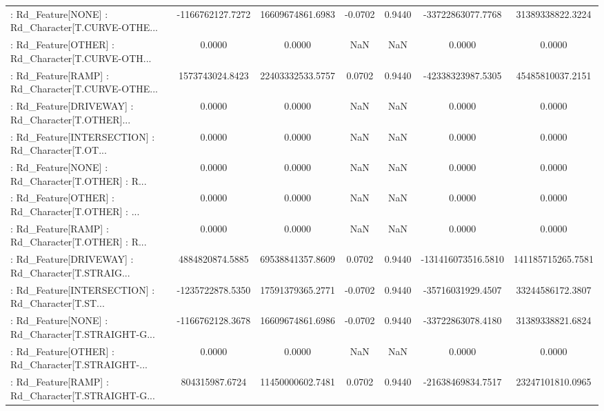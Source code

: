 \begin{longtable}{p{4cm}cccccc}
 : Rd\_Feature[NONE] : Rd\_Character[T.CURVE-OTHE... &  -1166762127.7272 &  16609674861.6983 & -0.0702 &       0.9440 &  -33722863077.7768 &  31389338822.3224 \\
 : Rd\_Feature[OTHER] : Rd\_Character[T.CURVE-OTH... &            0.0000 &            0.0000 &     NaN &          NaN &             0.0000 &            0.0000 \\
 : Rd\_Feature[RAMP] : Rd\_Character[T.CURVE-OTHE... &   1573743024.8423 &  22403332533.5757 &  0.0702 &       0.9440 &  -42338323987.5305 &  45485810037.2151 \\
 : Rd\_Feature[DRIVEWAY] : Rd\_Character[T.OTHER]... &            0.0000 &            0.0000 &     NaN &          NaN &             0.0000 &            0.0000 \\
 : Rd\_Feature[INTERSECTION] : Rd\_Character[T.OT... &            0.0000 &            0.0000 &     NaN &          NaN &             0.0000 &            0.0000 \\
 : Rd\_Feature[NONE] : Rd\_Character[T.OTHER] : R... &            0.0000 &            0.0000 &     NaN &          NaN &             0.0000 &            0.0000 \\
 : Rd\_Feature[OTHER] : Rd\_Character[T.OTHER] : ... &            0.0000 &            0.0000 &     NaN &          NaN &             0.0000 &            0.0000 \\
 : Rd\_Feature[RAMP] : Rd\_Character[T.OTHER] : R... &            0.0000 &            0.0000 &     NaN &          NaN &             0.0000 &            0.0000 \\
 : Rd\_Feature[DRIVEWAY] : Rd\_Character[T.STRAIG... &   4884820874.5885 &  69538841357.8609 &  0.0702 &       0.9440 & -131416073516.5810 & 141185715265.7581 \\
 : Rd\_Feature[INTERSECTION] : Rd\_Character[T.ST... &  -1235722878.5350 &  17591379365.2771 & -0.0702 &       0.9440 &  -35716031929.4507 &  33244586172.3807 \\
 : Rd\_Feature[NONE] : Rd\_Character[T.STRAIGHT-G... &  -1166762128.3678 &  16609674861.6986 & -0.0702 &       0.9440 &  -33722863078.4180 &  31389338821.6824 \\
 : Rd\_Feature[OTHER] : Rd\_Character[T.STRAIGHT-... &            0.0000 &            0.0000 &     NaN &          NaN &             0.0000 &            0.0000 \\
 : Rd\_Feature[RAMP] : Rd\_Character[T.STRAIGHT-G... &    804315987.6724 &  11450000602.7481 &  0.0702 &       0.9440 &  -21638469834.7517 &  23247101810.0965 \\

\end{longtable}
